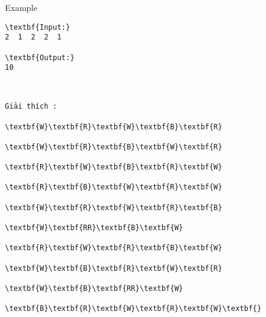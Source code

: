 Example
\begin{verbatim}
\textbf{Input:}
2  1  2  2  1

\textbf{Output:}
10\end{verbatim}
\begin{verbatim}


Giải thích :

\textbf{W}\textbf{R}\textbf{W}\textbf{B}\textbf{R}

\textbf{W}\textbf{R}\textbf{B}\textbf{W}\textbf{R}

\textbf{R}\textbf{W}\textbf{B}\textbf{R}\textbf{W}

\textbf{R}\textbf{B}\textbf{W}\textbf{R}\textbf{W}

\textbf{W}\textbf{R}\textbf{W}\textbf{R}\textbf{B}

\textbf{W}\textbf{RR}\textbf{B}\textbf{W}

\textbf{R}\textbf{W}\textbf{R}\textbf{B}\textbf{W}

\textbf{W}\textbf{B}\textbf{R}\textbf{W}\textbf{R}

\textbf{W}\textbf{B}\textbf{RR}\textbf{W}

\textbf{B}\textbf{R}\textbf{W}\textbf{R}\textbf{W}\textbf{}\end{verbatim}
